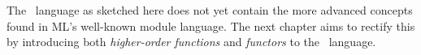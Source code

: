 The \MiniML\ language as sketched here does not yet contain the more advanced concepts found in ML's well-known module language.
The next chapter aims to rectify this by introducing both \emph{higher-order functions} and \emph{functors} to the \MiniML\ language.




